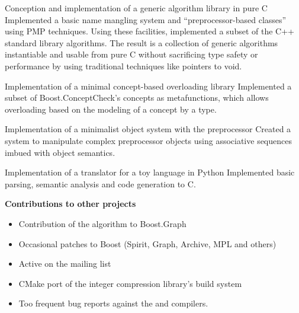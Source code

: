 \documentclass[10pt]{moderncv}
\newcommand{\myhref}[3][blue]{\href{#2}{\color{#1}{#3}}}
\begin{document}
{Conception and implementation of a generic algorithm library in pure C}{
    Implemented a basic name mangling system and ``preprocessor-based classes''
    using PMP techniques. Using these facilities, implemented a subset of the
    C++ standard library algorithms. The result is a collection of generic
    algorithms instantiable and usable from pure C without sacrificing type
    safety or performance by using traditional techniques like pointers to void.}

{Implementation of a minimal concept-based overloading library}{
    Implemented a subset of Boost.ConceptCheck's concepts as metafunctions,
    which allows overloading based on the modeling of a concept by a type.}

{Implementation of a minimalist object system with the preprocessor}{
    Created a system to manipulate complex preprocessor objects using
    associative sequences imbued with object semantics.}

{Implementation of a translator for a toy language in Python}{
    Implemented basic parsing, semantic analysis and code generation to C.}

\cvline{}
{\textbf{Contributions to other projects}
\begin{itemize}
    \item Contribution of the \myhref{http://www.boost.org/doc/libs/release/libs/graph/doc/hawick_circuits.html}{hawick\_circuits} algorithm to Boost.Graph
    \item Occasional patches to Boost (Spirit, Graph, Archive, MPL and others)
    \item Active on the \myhref{http://news.gmane.org/gmane.comp.lib.boost.devel}{Boost.Dev} mailing list
    \item CMake port of the \myhref{http://github.com/lemire/FastPFor}{FastPFor}
          integer compression library's build system
    \item Too frequent bug reports against the \myhref{https://goo.gl/y9pYWP}{Clang}
          and \myhref{https://goo.gl/IhKUrK}{GCC} compilers.
\end{itemize}}
\end{document}

